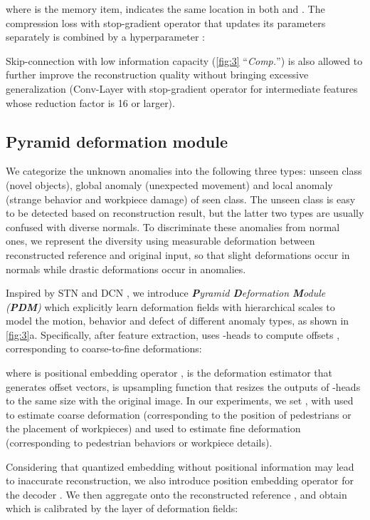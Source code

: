 \documentclass[10pt,twocolumn,letterpaper]{article}
\begin{document}
            where  is the  memory item,  indicates the same location in both  and . 
            The compression loss  with stop-gradient operator  that updates its parameters separately\cite{vqvae} is combined by a hyperparameter :
            

            Skip-connection with low information capacity (\cref{fig:3} ``\textit{Comp.}'') is also allowed to further improve the reconstruction quality without bringing excessive generalization (\ie Conv-Layer with stop-gradient operator for intermediate features whose reduction factor is 16 or larger).
            
    \subsection{Pyramid deformation module}
        We categorize the unknown anomalies into the following three types: unseen class (\eg novel objects), global anomaly (\eg unexpected movement) and local anomaly (\eg strange behavior and workpiece damage) of seen class. The unseen class is easy to be detected based on reconstruction result, but the latter two types are usually confused with diverse normals. To discriminate these anomalies from normal ones, we represent the diversity using measurable deformation between reconstructed reference and original input, so that slight deformations occur in normals while drastic deformations occur in anomalies. 
        
        Inspired by STN and DCN \cite{stn,dcn}, we introduce \textit{\textbf{P}yramid \textbf{D}eformation \textbf{M}odule (\textbf{PDM})} which explicitly learn deformation fields with hierarchical scales to model the motion, behavior and defect of different anomaly types, as shown in \cref{fig:3}a. Specifically, after feature extraction,  uses -heads to compute offsets , corresponding to  coarse-to-fine deformations: 
        
        where  is positional embedding operator \cite{coordconv},  is the deformation estimator that generates offset vectors,  is upsampling function that resizes the outputs of -heads to the same size with the original image. In our experiments, we set , with  used to estimate coarse deformation (\eg corresponding to the position of pedestrians or the placement of workpieces) and  used to estimate fine deformation (\eg corresponding to pedestrian behaviors or workpiece details).
            
        Considering that quantized embedding without positional information may lead to inaccurate reconstruction, we also introduce position embedding operator for the decoder . We then aggregate  onto the reconstructed reference , and obtain  which is calibrated by the  layer of deformation fields:
        
\end{document}
